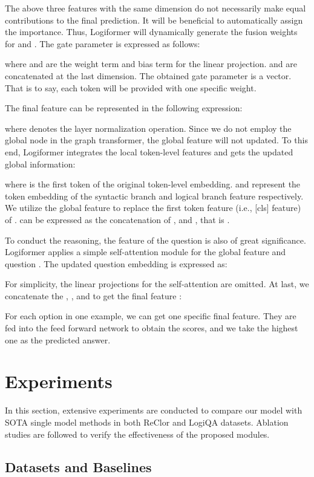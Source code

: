 \documentclass[sigconf]{acmart}
\begin{document}
The above three features with the same dimension do not necessarily make equal contributions to the final prediction. It will be beneficial to automatically assign the importance. Thus, Logiformer will dynamically generate the fusion weights for  and . The gate parameter  is expressed as follows:


where  and  are the weight term and bias term for the linear projection.  and  are concatenated at the last dimension. The obtained gate parameter  is a vector. That is to say, each token will be provided with one specific weight.

The final feature  can be represented in the following expression:

where  denotes the layer normalization operation. Since we do not employ the global node in the graph transformer, the global feature will not updated. To this end, Logiformer integrates the local token-level features and gets the updated global information:


where  is the first token of the original token-level embedding.  and  represent the  token embedding of the syntactic branch and logical branch feature respectively. We utilize the global feature  to replace the first token feature (i.e., [cls] feature) of .  can be expressed as the concatenation of ,  and , that is .

To conduct the reasoning, the feature of the question  is also of great significance. Logiformer applies a simple self-attention module for the global feature  and question . The updated question embedding is expressed as:



For simplicity, the linear projections for the self-attention are omitted. At last, we concatenate the , ,  and  to get the final feature :



For each option in one example, we can get one specific final feature. They are fed into the feed forward network to obtain the scores, and we take the highest one as the predicted answer. 

\section{Experiments}
In this section, extensive experiments are conducted to compare our model with SOTA single model methods in both ReClor and LogiQA datasets. Ablation studies are followed to verify the effectiveness of the proposed modules.


\subsection{Datasets and Baselines}
\end{document}
